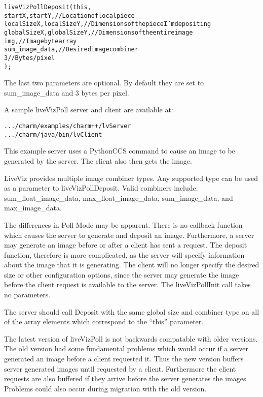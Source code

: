 \begin{alltt}
  liveVizPollDeposit( this,
                      startX,startY,            // Location of local piece
                      localSizeX,localSizeY,    // Dimensions of the piece I'm depositing
                      globalSizeX,globalSizeY,  // Dimensions of the entire image
                      img,                      // Image byte array
                      sum_image_data,           // Desired image combiner
                      3                         // Bytes/pixel
                    );
\end{alltt}
The last two parameters are optional. By default they are set to sum\_image\_data and 3 bytes per pixel.



A sample liveVizPoll server and client are available at:
\begin{alltt}
           .../charm/examples/charm++/lvServer
           .../charm/java/bin/lvClient
\end{alltt}
This example server uses a PythonCCS command to cause an image to be generated by the server. The client also then gets the image.

LiveViz provides multiple image combiner types. Any supported type can be used as a parameter to liveVizPollDeposit. Valid combiners include: sum\_float\_image\_data, max\_float\_image\_data, sum\_image\_data, and max\_image\_data. 

The differences in Poll Mode may be apparent. There is no callback function which causes the server to generate and deposit an image. Furthermore, a server may generate an image before or after a client has sent a request. The deposit function, therefore is more complicated, as the server will specify information about the image that it is generating. The client will no longer specify the desired size or other configuration options, since the server may generate the image before the client request is available to the server. The liveVizPollInit call takes no parameters.

The server should call Deposit with the same global size and combiner type on all of the array elements which correspond to the ``this'' parameter.

The latest version of liveVizPoll is not backwards compatable with older versions. The old version had some fundamental problems which would occur if a server generated an image before a client requested it. Thus the new version buffers server generated images until requested by a client. Furthermore the client requests are also buffered if they arrive before the server generates the images. Problems could also occur during migration with the old version.

